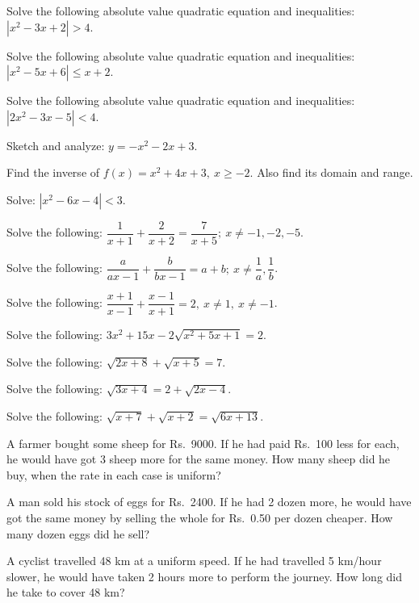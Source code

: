 \documentclass[11pt,a4paper]{article}
\begin{document}
\begin{longlist}
\item Solve the following absolute value quadratic equation and inequalities: $|x^2-3x+2|>4$.

\item Solve the following absolute value quadratic equation and inequalities: $|x^2-5x+6|\leq x+2$.

\item Solve the following absolute value quadratic equation and inequalities: $|2x^2-3x-5|<4$.

\item Sketch and analyze: $y=-x^2-2x+3$.

\item Find the inverse of $f(x)=x^2+4x+3,\ x\geq -2$. Also find its domain and range.

\item Solve: $|x^2-6x-4|<3$.

\item Solve the following: $\dfrac{1}{x+1}+\dfrac{2}{x+2}=\dfrac{7}{x+5};\ x\neq -1,-2,-5$.

\item Solve the following: $\dfrac{a}{ax-1}+\dfrac{b}{bx-1}=a+b;\ x\neq \dfrac{1}{a},\dfrac{1}{b}$.

\item Solve the following: $\dfrac{x+1}{x-1}+\dfrac{x-1}{x+1}=2,\ x\neq 1,\ x\neq -1$.

\item Solve the following: $3x^2+15x-2\sqrt{x^2+5x+1}=2$.

\item Solve the following: $\sqrt{2x+8}+\sqrt{x+5}=7$.

\item Solve the following: $\sqrt{3x+4}=2+\sqrt{2x-4}$.

\item Solve the following: $\sqrt{x+7}+\sqrt{x+2}=\sqrt{6x+13}$.

\item A farmer bought some sheep for Rs.\ 9000. If he had paid Rs.\ 100 less for each, he would have got 3 sheep more for the same money. How many sheep did he buy, when the rate in each case is uniform?

\item A man sold his stock of eggs for Rs.\ 2400. If he had 2 dozen more, he would have got the same money by selling the whole for Rs.\ 0.50 per dozen cheaper. How many dozen eggs did he sell?

\item A cyclist travelled 48 km at a uniform speed. If he had travelled 5 km/hour slower, he would have taken 2 hours more to perform the journey. How long did he take to cover 48 km?


\end{longlist}
\end{document}
